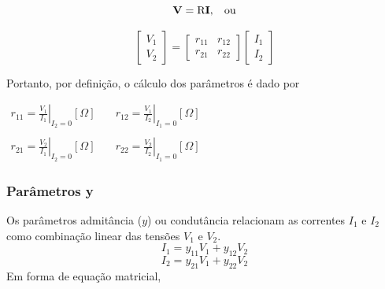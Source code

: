 \documentclass{article}
\numberwithin{equation}{section}
\begin{document}
    \begin{equation*}
        \textbf{V}=\text{R}\textbf{I}, \hspace{0.3cm} \text{ou}
    \end{equation*}

    \begin{equation}
        \begin{bmatrix}
            V_{1} \\
            V_{2}
        \end{bmatrix}
        = %
        \begin{bmatrix}
            r_{11} & r_{12} \\
            r_{21} & r_{22}
        \end{bmatrix}
        \begin{bmatrix}
            I_{1} \\
            I_{2}
        \end{bmatrix}
    \end{equation}

    Portanto, por definição, o cálculo dos parâmetros é dado por
    \begin{center}
        $\begin{matrix} %
                r_{11}=\displaystyle\left.\frac{V_{1}}{I_{1}}\right|_{I_{2}=0} [\Omega] & \quad r_{12}=\displaystyle\left.\frac{V_{1}}{I_{2}}\right|_{I_{1}=0} [\Omega]\\ \\
                r_{21}=\displaystyle\left.\frac{V_{2}}{I_{1}}\right|_{I_{2}=0} [\Omega] & \quad  r_{22}=\displaystyle\left.\frac{V_{2}}{I_{2}}\right|_{I_{1}=0} [\Omega]
        \end{matrix}$
    \end{center}
    \subsubsection{Parâmetros y}
    \label{subsubsec:quadripolosy}
    Os parâmetros admitância ($y$) ou condutância relacionam as correntes $I_{1}$ e $I_{2}$ como combinação linear das tensões $V_{1}$ e $V_{2}$.
    \begin{equation*}
        I_{1}=y_{11}V_{1}+y_{12}V_{2}
    \end{equation*}
    \begin{equation*}
        I_{2}=y_{21}V_{1}+y_{22}V_{2}
    \end{equation*}
    Em forma de equação matricial,
\end{document}
